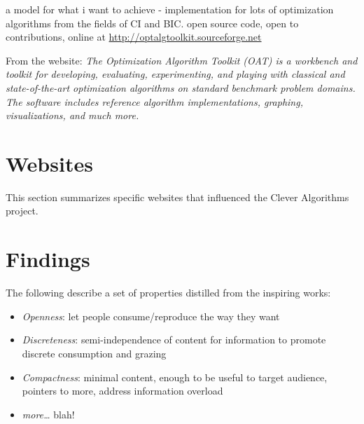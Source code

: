 \documentclass[a4paper, 11pt]{article}
\begin{document}
a model for what i want to achieve - implementation for lots of optimization algorithms from the fields of CI and BIC. open source code, open to contributions, online at \url{http://optalgtoolkit.sourceforge.net}

From the website: 
\emph{The Optimization Algorithm Toolkit (OAT) is a workbench and toolkit for developing, evaluating, experimenting, and playing with classical and state-of-the-art optimization algorithms on standard benchmark problem domains. The software includes reference algorithm implementations, graphing, visualizations, and much more.}


\section{Websites}
\label{sec:websites}
This section summarizes specific websites that influenced the Clever Algorithms project.


\section{Findings}
\label{sec:findings}

The following describe a set of properties distilled from the inspiring works:

\begin{itemize}
	\item \emph{Openness}: let people consume/reproduce the way they want
	\item \emph{Discreteness}: semi-independence of content for information to promote discrete consumption and grazing
	\item \emph{Compactness}: minimal content, enough to be useful to target audience, pointers to more, address information overload 
	\item \emph{more\ldots} blah!
\end{itemize}





\end{document}
